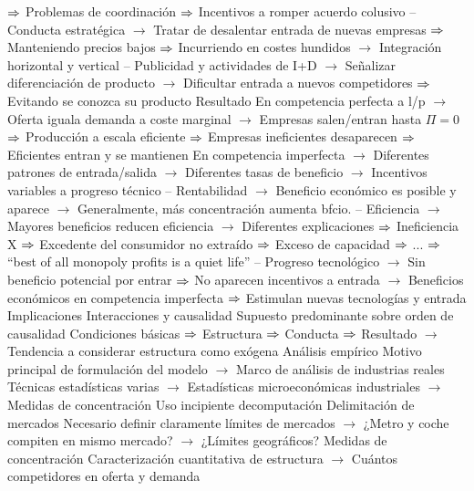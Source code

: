 \documentclass{nuevotema}
\begin{document}
\begin{esquemal}
				\4[] $\Rightarrow$ Problemas de coordinación
				\4[] $\Rightarrow$ Incentivos a romper acuerdo colusivo
				\4[] -- Conducta estratégica
				\4[] $\to$ Tratar de desalentar entrada de nuevas empresas
				\4[] $\Rightarrow$ Manteniendo precios bajos
				\4[] $\Rightarrow$ Incurriendo en costes hundidos
				\4[] $\to$ Integración horizontal y vertical
				\4[] -- Publicidad y actividades de I+D
				\4[] $\to$ Señalizar diferenciación de producto
				\4[] $\to$ Dificultar entrada a nuevos competidores
				\4[] $\Rightarrow$ Evitando se conozca su producto
				\4 Resultado
				\4[] En competencia perfecta a l/p
				\4[] $\to$ Oferta iguala demanda a coste marginal
				\4[] $\to$ Empresas salen/entran hasta $\Pi = 0$
				\4[] $\Rightarrow$ Producción a escala eficiente
				\4[] $\Rightarrow$ Empresas ineficientes desaparecen
				\4[] $\Rightarrow$ Eficientes entran y se mantienen
				\4[] En competencia imperfecta
				\4[] $\to$ Diferentes patrones de entrada/salida
				\4[] $\to$ Diferentes tasas de beneficio
				\4[] $\to$ Incentivos variables a progreso técnico
				\4[] -- Rentabilidad
				\4[] $\to$ Beneficio económico es posible y aparece
				\4[] $\to$ Generalmente, más concentración aumenta bfcio.
				\4[] -- Eficiencia
				\4[] $\to$ Mayores beneficios reducen eficiencia
				\4[] $\to$ Diferentes explicaciones
				\4[] $\Rightarrow$ Ineficiencia X
				\4[] $\Rightarrow$ Excedente del consumidor no extraído
				\4[] $\Rightarrow$ Exceso de capacidad
				\4[] $\Rightarrow$ ...
				\4[] $\Rightarrow$ ``best of all monopoly profits is a quiet life''
				\4[] -- Progreso tecnológico
				\4[] $\to$ Sin beneficio potencial por entrar
				\4[] $\Rightarrow$ No aparecen incentivos a entrada
				\4[] $\to$ Beneficios económicos en competencia imperfecta
				\4[] $\Rightarrow$ Estimulan nuevas tecnologías y entrada
			\3 Implicaciones
				\4 Interacciones y causalidad
				\4[] Supuesto predominante sobre orden de causalidad
				\4[] Condiciones básicas $\Rightarrow$ Estructura $\Rightarrow$ Conducta $\Rightarrow$ Resultado
				\4[] $\to$ Tendencia a considerar estructura como exógena
				\4 Análisis empírico
				\4[] Motivo principal de formulación del modelo
				\4[] $\to$ Marco de análisis de industrias reales
				\4[] Técnicas estadísticas varias
				\4[] $\to$ Estadísticas microeconómicas industriales
				\4[] $\to$ Medidas de concentración
				\4[] Uso incipiente decomputación
				\4 Delimitación de mercados
				\4[] Necesario definir claramente límites de mercados
				\4[] $\to$ ¿Metro y coche compiten en mismo mercado?
				\4[] $\to$ ¿Límites geográficos?
				\4 Medidas de concentración
				\4[] Caracterización cuantitativa de estructura
				\4[] $\to$ Cuántos competidores en oferta y demanda

\end{esquemal}
\end{document}
